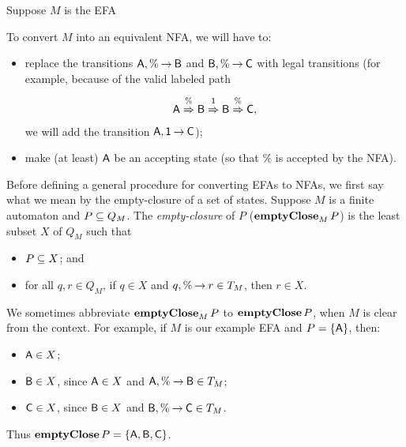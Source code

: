 %
%

Suppose $M$ is the EFA
\begin{center}

\end{center}
To convert $M$ into an equivalent NFA, we will have to:
\begin{itemize}
\item replace the transitions $\mathsf{A},\%\mathbin{\to}\mathsf{B}$ and $\mathsf{B},\%\mathbin{\to}\mathsf{C}$
  with legal transitions (for example, because of the valid labeled
  path
  \begin{gather*}
    \mathsf{A}\stackrel{\strut\%}{\Rightarrow}\mathsf{B}\stackrel{\strut\mathsf{1}}{\Rightarrow}\mathsf{B}\stackrel{\strut\%}{\Rightarrow}\mathsf{C},
  \end{gather*}
  we will add the transition $\mathsf{A},\mathsf{1}\mathbin{\to}\mathsf{C}$);

\item make (at least) $\mathsf{A}$ be an accepting state (so that $\%$ is
  accepted by the NFA).
\end{itemize}

Before defining a general procedure for converting EFAs to NFAs, we
first say what we mean by the empty-closure of a set of states.
Suppose $M$ is a finite automaton and $P\subseteq Q_M$.  The
\emph{empty-closure} of $P$ ($\mathbf{emptyClose}_M\,P$) is the least subset
$X$ of $Q_M$ such that
\begin{itemize}
\item $P\subseteq X$; and

\item for all $q,r\in Q_M$, if $q\in X$ and $q,\%\mathbin{\to} r\in T_M$, then
$r\in X$.
\end{itemize}
We sometimes abbreviate $\mathbf{emptyClose}_M\,P$ to $\mathbf{emptyClose}\,P$, when
$M$ is clear from the context.
For example, if $M$ is our example EFA and $P=\{\mathsf{A}\}$, then:
\begin{itemize}
\item $\mathsf{A}\in X$;

\item $\mathsf{B}\in X$, since $\mathsf{A}\in X$ and $\mathsf{A},\%\mathbin{\to}\mathsf{B}\in T_M$;

\item $\mathsf{C}\in X$, since $\mathsf{B}\in X$ and $\mathsf{B},\%\mathbin{\to}\mathsf{C}\in T_M$.
\end{itemize}
Thus $\mathbf{emptyClose}\,P=\{\mathsf{A},\mathsf{B},\mathsf{C}\}$.

